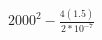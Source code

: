 \documentclass[preview]{standalone}
\begin{document}
\begin{center}
$2000^2 - \frac{4(1.5)}{2 * 10^{-7}}$
\end{center}
\end{document}
